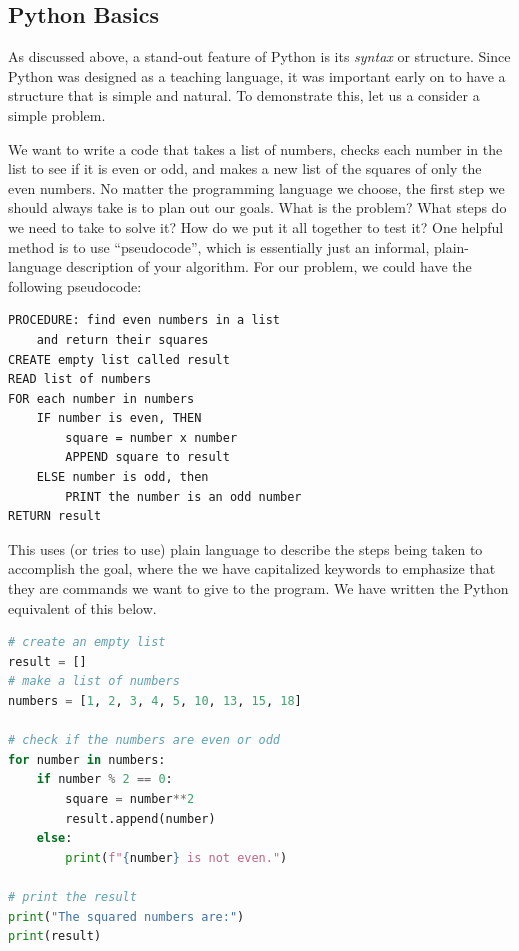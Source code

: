 \documentclass{tufte-book}
\begin{document}


\subsection{Python Basics}\label{subsec:python-basics}



As discussed above, a stand-out feature of Python is its \textit{syntax} or structure. Since Python was designed as a teaching language, it was important early on to have a structure that is simple and natural. To demonstrate this, let us a consider a simple problem. 

We want to write a code that takes a list of numbers, checks each number in the list to see if it is even or odd, and makes a new list of the squares of only the even numbers. No matter the programming language we choose, the first step we should always take is to plan out our goals. What is the problem? What steps do we need to take to solve it? How do we put it all together to test it? One helpful method is to use ``pseudocode'', which is essentially just an informal, plain-language description of your algorithm. For our problem, we could have the following pseudocode:

\begin{lstlisting}[backgroundcolor=\color{lightgray}]
PROCEDURE: find even numbers in a list 
    and return their squares
CREATE empty list called result
READ list of numbers
FOR each number in numbers
    IF number is even, THEN
        square = number x number
        APPEND square to result
    ELSE number is odd, then
        PRINT the number is an odd number
RETURN result
\end{lstlisting}

This uses (or tries to use) plain language to describe the steps being taken to accomplish the goal, where the we have capitalized keywords to emphasize that they are commands we want to give to the program. We have written the Python equivalent of this below. 

\begin{lstlisting}[language=Python, showstringspaces=false,
backgroundcolor=\color{lightgray}]
# create an empty list
result = []
# make a list of numbers
numbers = [1, 2, 3, 4, 5, 10, 13, 15, 18]

# check if the numbers are even or odd
for number in numbers:
    if number % 2 == 0:
        square = number**2
        result.append(number)
    else:
        print(f"{number} is not even.")

# print the result
print("The squared numbers are:")
print(result)
\end{lstlisting}
\end{document}
